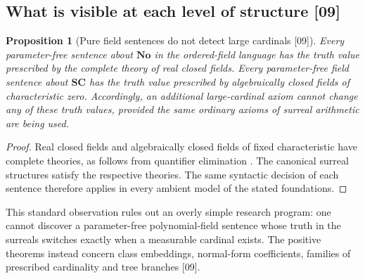 \documentclass[11pt,letterpaper]{article}
\numberwithin{equation}{section}
\newtheorem{proposition}[theorem]{Proposition}
\theoremstyle{definition}
\theoremstyle{remark}
\newcommand{\No}{\mathbf{No}}
\newcommand{\SC}{\mathbf{SC}}
\newcommand{\src}[1]{\textup{\textsf{\small[#1]}}}%
\begin{document}
\subsection{What is visible at each level of structure \src{09}}
\begin{proposition}[Pure field sentences do not detect large cardinals \src{09}]
\label{lce:sg:prop:purefield}
Every parameter-free sentence about $\No$ in the ordered-field language has
the truth value prescribed by the complete theory of real closed fields.
Every parameter-free field sentence about $\SC$ has the truth value
prescribed by algebraically closed fields of characteristic zero.
Accordingly, an additional large-cardinal axiom cannot change any of these
truth values, provided the same ordinary axioms of surreal arithmetic are
being used.
\end{proposition}
\begin{proof}
Real closed fields and algebraically closed fields of fixed characteristic
have complete theories, as follows from quantifier elimination
\cite{Marker}. The canonical surreal structures satisfy the respective
theories. The same syntactic decision of each sentence therefore applies in
every ambient model of the stated foundations.
\end{proof}
This standard observation rules out an overly simple research program: one
cannot discover a parameter-free polynomial-field sentence whose truth in
the surreals switches exactly when a measurable cardinal exists. The
positive theorems instead concern class embeddings, normal-form
coefficients, families of prescribed cardinality and tree branches \src{09}.
\end{document}
